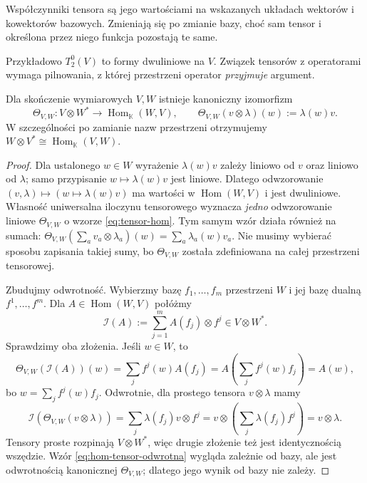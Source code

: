 Współczynniki tensora są jego wartościami na wskazanych układach
wektorów i kowektorów bazowych. Zmieniają się po zmianie bazy,
choć sam tensor i określona przez niego funkcja pozostają te same.

Przykładowo $T^0_2(V)$ to formy dwuliniowe na $V$.
Związek tensorów z operatorami wymaga pilnowania,
z której przestrzeni operator \emph{przyjmuje} argument.

\begin{twierdzenie}
\label{thm:tensor-hom}
Dla skończenie wymiarowych $V,W$ istnieje kanoniczny izomorfizm
\begin{equation}\label{eq:tensor-hom}
 \Theta_{V,W}\colon V\otimes W^*\longrightarrow
 \operatorname{Hom}_{\mathbb K}(W,V),\qquad
 \Theta_{V,W}(v\otimes\lambda)(w):=\lambda(w)v.
\end{equation}
W szczególności po zamianie nazw przestrzeni otrzymujemy
$W\otimes V^*\cong\operatorname{Hom}_{\mathbb K}(V,W)$.
\end{twierdzenie}
\begin{proof}
Dla ustalonego $w\in W$ wyrażenie $\lambda(w)v$ zależy
liniowo od $v$ oraz liniowo od $\lambda$; samo przypisanie
$w\mapsto\lambda(w)v$ jest liniowe. Dlatego odwzorowanie
$(v,\lambda)\mapsto(w\mapsto\lambda(w)v)$ ma wartości
w $\operatorname{Hom}(W,V)$ i jest dwuliniowe.
Własność uniwersalna iloczynu tensorowego wyznacza
\emph{jedno} odwzorowanie liniowe $\Theta_{V,W}$ o wzorze
\eqref{eq:tensor-hom}. Tym samym wzór działa również
na sumach: $\Theta_{V,W}(\sum_a v_a\otimes\lambda_a)(w)
=\sum_a\lambda_a(w)v_a$. Nie musimy wybierać sposobu
zapisania takiej sumy, bo $\Theta_{V,W}$ została zdefiniowana
na całej przestrzeni tensorowej.

Zbudujmy odwrotność. Wybierzmy bazę $f_1,\ldots,f_m$
przestrzeni $W$ i jej bazę dualną $f^1,\ldots,f^m$.
Dla $A\in\operatorname{Hom}(W,V)$ połóżmy
\begin{equation}\label{eq:hom-tensor-odwrotna}
 \mathcal I(A):=\sum_{j=1}^m A(f_j)\otimes f^j\in V\otimes W^*.
\end{equation}
Sprawdzimy oba złożenia. Jeśli $w\in W$, to
\[
 \Theta_{V,W}(\mathcal I(A))(w)
 =\sum_j f^j(w)A(f_j)
 =A\!\left(\sum_j f^j(w)f_j\right)=A(w),
\]
bo $w=\sum_j f^j(w)f_j$. Odwrotnie, dla prostego
tensora $v\otimes\lambda$ mamy
\[
 \mathcal I(\Theta_{V,W}(v\otimes\lambda))
 =\sum_j\lambda(f_j)v\otimes f^j
 =v\otimes\left(\sum_j\lambda(f_j)f^j\right)
 =v\otimes\lambda.
\]
Tensory proste rozpinają $V\otimes W^*$, więc drugie
złożenie też jest identycznością wszędzie. Wzór
\eqref{eq:hom-tensor-odwrotna} wygląda zależnie od bazy,
ale jest odwrotnością kanonicznej $\Theta_{V,W}$;
dlatego jego wynik od bazy nie zależy.
\end{proof}

